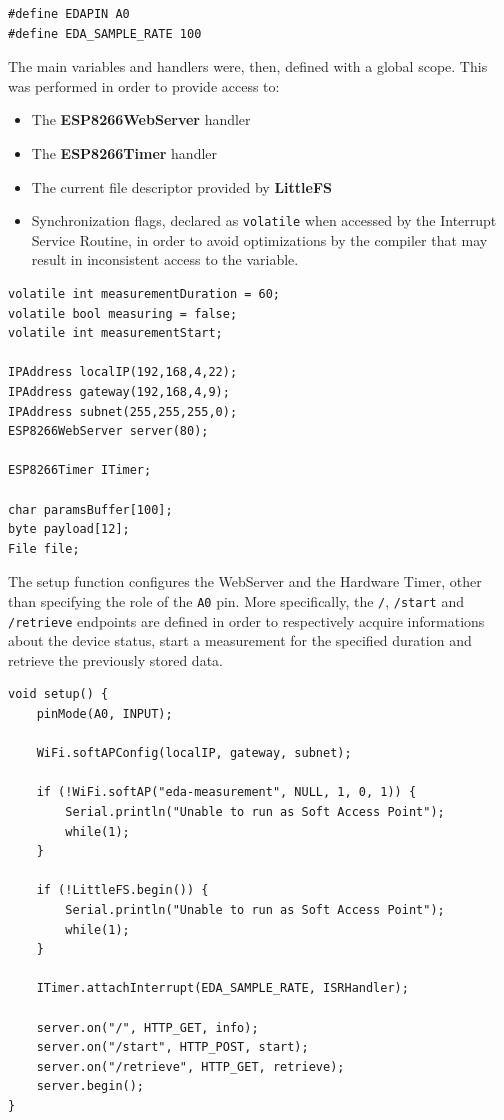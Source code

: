 \begin{verbatim}
#define EDAPIN A0
#define EDA_SAMPLE_RATE 100
\end{verbatim}

The main variables and handlers were, then, defined with a global scope. This was performed in order to provide access to:

\begin{itemize}
    \item The \textbf{ESP8266WebServer} handler
    \item The \textbf{ESP8266Timer} handler
    \item The current file descriptor provided by \textbf{LittleFS}
    \item Synchronization flags, declared as \texttt{volatile} when accessed by the Interrupt Service Routine, in order to avoid optimizations by the compiler that may result in inconsistent access to the variable.
\end{itemize}


\begin{verbatim}
volatile int measurementDuration = 60;
volatile bool measuring = false;
volatile int measurementStart;

IPAddress localIP(192,168,4,22);
IPAddress gateway(192,168,4,9);
IPAddress subnet(255,255,255,0);
ESP8266WebServer server(80);

ESP8266Timer ITimer;

char paramsBuffer[100];
byte payload[12];
File file;
\end{verbatim}

The setup function configures the WebServer and the Hardware Timer, other than specifying the role of the \texttt{A0} pin. More specifically, the \texttt{/}, \texttt{/start} and \texttt{/retrieve} endpoints are defined in order to respectively acquire informations about the device status, start a measurement for the specified duration and retrieve the previously stored data.

\begin{verbatim}
void setup() {
    pinMode(A0, INPUT);

    WiFi.softAPConfig(localIP, gateway, subnet);
    
    if (!WiFi.softAP("eda-measurement", NULL, 1, 0, 1)) {
        Serial.println("Unable to run as Soft Access Point");
        while(1);
    }

    if (!LittleFS.begin()) {
        Serial.println("Unable to run as Soft Access Point");
        while(1);
    }

    ITimer.attachInterrupt(EDA_SAMPLE_RATE, ISRHandler);

    server.on("/", HTTP_GET, info);
    server.on("/start", HTTP_POST, start);
    server.on("/retrieve", HTTP_GET, retrieve);
    server.begin();
}
\end{verbatim}

